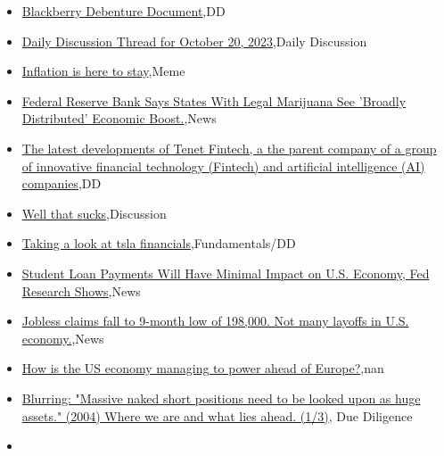 \documentclass{article}%
\begin{document}
%
\begin{itemize}%
\item%
\href{https://reddit.com/r/wallstreetbets/comments/17cagkx/blackberry\_debenture\_document/}{Blackberry Debenture Document},DD%
\item%
\href{https://reddit.com/r/wallstreetbets/comments/17c7m33/daily\_discussion\_thread\_for\_october\_20\_2023/}{Daily Discussion Thread for October 20, 2023},Daily Discussion%
\item%
\href{https://reddit.com/r/wallstreetbets/comments/17c69nm/inflation\_is\_here\_to\_stay/}{Inflation is here to stay},Meme%
\item%
\href{https://reddit.com/r/wallstreetbets/comments/17c5a5f/federal\_reserve\_bank\_says\_states\_with\_legal/}{Federal Reserve Bank Says States With Legal Marijuana See 'Broadly Distributed' Economic Boost.},News%
\item%
\href{https://reddit.com/r/Baystreetbets/comments/17bne22/the\_latest\_developments\_of\_tenet\_fintech\_a\_the/}{The latest developments of Tenet Fintech, a the parent company of a group of innovative financial technology (Fintech) and artificial intelligence (AI) companies},DD%
\item%
\href{https://reddit.com/r/StockMarket/comments/17bsib2/well\_that\_sucks/}{Well that sucks},Discussion%
\item%
\href{https://reddit.com/r/StockMarket/comments/17bsi4k/taking\_a\_look\_at\_tsla\_financials/}{Taking a look at tsla financials},Fundamentals/DD%
\item%
\href{https://reddit.com/r/Economics/comments/17c2z9j/student\_loan\_payments\_will\_have\_minimal\_impact\_on/}{Student Loan Payments Will Have Minimal Impact on U.S. Economy, Fed Research Shows},News%
\item%
\href{https://reddit.com/r/Economics/comments/17buos4/jobless\_claims\_fall\_to\_9month\_low\_of\_198000\_not/}{Jobless claims fall to 9-month low of 198,000. Not many layoffs in U.S. economy.},News%
\item%
\href{https://reddit.com/r/Economics/comments/17brswo/how\_is\_the\_us\_economy\_managing\_to\_power\_ahead\_of/}{How is the US economy managing to power ahead of Europe?},nan%
\item%
\href{https://reddit.com/r/Superstonk/comments/17c9owv/blurring\_massive\_naked\_short\_positions\_need\_to\_be/}{Blurring: "Massive naked short positions need to be looked upon as huge assets." (2004) Where we are and what lies ahead. (1/3)}, Due Diligence%
\item%

\end{itemize}
\end{document}
